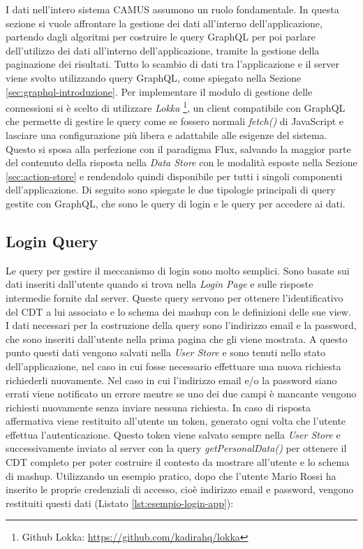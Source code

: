 I dati nell'intero sistema CAMUS assumono un ruolo fondamentale. In questa sezione si vuole affrontare la gestione dei dati all'interno dell'applicazione, partendo dagli algoritmi per costruire le query GraphQL per poi parlare dell'utilizzo dei dati all'interno dell'applicazione, tramite la gestione della paginazione dei risultati.
Tutto lo scambio di dati tra l'applicazione e il server viene svolto utilizzando query GraphQL, come spiegato nella Sezione \ref{sec:graphql-introduzione}. Per implementare il modulo di gestione delle connessioni si è scelto di utilizzare \emph{Lokka} \footnote{Github Lokka: \url{https://github.com/kadirahq/lokka}}, un client compatibile con GraphQL che permette di gestire le query come se fossero normali \emph{fetch()} di JavaScript e lasciare una configurazione più libera e adattabile alle esigenze del sistema. Questo si sposa alla perfezione con il paradigma Flux, salvando la maggior parte del contenuto della risposta nella \emph{Data Store} con le modalità esposte nella Sezione \ref{sec:action-store} e rendendolo quindi disponibile per tutti i singoli componenti dell'applicazione. Di seguito sono spiegate le due tipologie principali di query gestite con GraphQL, che sono le query di login e le query per accedere ai dati.

\subsection{Login Query}
Le query per gestire il meccanismo di login sono molto semplici. Sono basate sui dati inseriti dall'utente quando si trova nella \emph{Login Page} e sulle risposte intermedie fornite dal server. Queste query servono per ottenere l'identificativo del CDT a lui associato e lo schema dei mashup con le definizioni delle sue view.
I dati necessari per la costruzione della query sono l'indirizzo email e la password, che sono inseriti dall'utente nella prima pagina che gli viene mostrata. A questo punto questi dati vengono salvati nella \emph{User Store} e sono tenuti nello stato dell'applicazione, nel caso in cui fosse necessario effettuare una nuova richiesta richiederli nuovamente. Nel caso in cui l'indirizzo email e/o la password siano errati viene notificato un errore mentre se uno dei due campi è mancante vengono richiesti nuovamente senza inviare nessuna richiesta.
In caso di risposta affermativa viene restituito all'utente un token, generato ogni volta che l'utente effettua l'autenticazione. Questo token viene salvato sempre nella \emph{User Store} e successivamente inviato al server con la query \emph{getPersonalData()} per ottenere il CDT completo per poter costruire il contesto da mostrare all'utente e lo schema di mashup.
Utilizzando un esempio pratico, dopo che l'utente Mario Rossi ha inserito le proprie credenziali di accesso, cioè indirizzo email e password, vengono restituiti questi dati (Listato \ref{lst:esempio-login-app}): 


